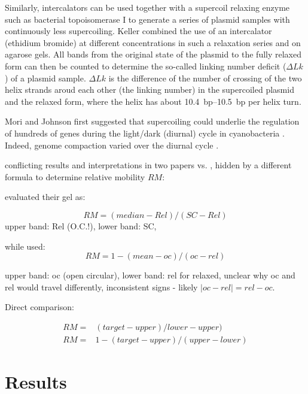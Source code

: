 \documentclass[10pt,letterpaper]{article}
\begin{document}
Similarly, intercalators can be used together with a supercoil
relaxing enzyme such as bacterial topoisomerase I to generate a series
of plasmid samples with continuously less supercoiling. Keller
combined the use of an intercalator (ethidium bromide) at different
concentrations in such a relaxation series and on agarose gels. All
bands from the original state of the plasmid to the fully relaxed form
can then be counted to determine the so-called linking number deficit
($\Delta Lk$) of a plasmid sample. $\Delta Lk$ is the difference of the
number of crossing of the two helix strands aroud each other (the
linking number) in the supercoiled plasmid and the relaxed form, where
the helix has about \SIrange{10.4}{10.5}{bp} per helix turn.


Mori and Johnson first suggested that supercoiling could underlie the
regulation of hundreds of genes during the light/dark (diurnal) cycle
in cyanobacteria \cite{Mori2001}. Indeed, genome compaction varied
over the diurnal cycle \cite{Smith2006}. 

conflicting results and interpretations in two papers
\cite{Woelfle2007} vs. \cite{Vijayan2009},
hidden by a different formula to determine relative mobility $RM$:

\cite{Woelfle2007} evaluated their gel as:

\begin{equation}
  RM = (median - Rel)/(SC - Rel)
\end{equation}
upper band: Rel (O.C.!), lower band: SC,

while \cite{Vijayan2009} used: 
\begin{equation}
  RM = 1 - (mean - oc)/(oc - rel)
\end{equation}

upper band: oc (open circular), lower band: rel for relaxed,
unclear why oc and rel would travel differently,
inconsistent signs - likely $|oc-rel|=rel-oc$.
       
Direct comparison:

\begin{align}
  RM =& (target - upper)/lower - upper)\\
  RM =& 1 - (target - upper)/(upper - lower)
\end{align}




\section{Results}
\end{document}

